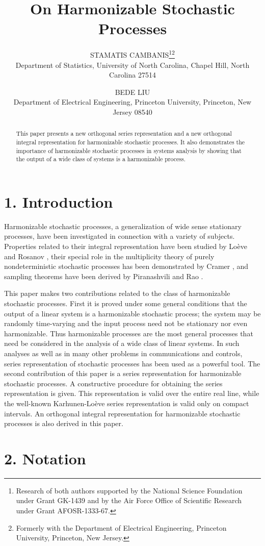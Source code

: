 \documentclass{article}
\title{On Harmonizable Stochastic Processes}
\author{
STAMATIS CAMBANIS\thanks{Research of both authors supported by the National Science Foundation under Grant GK-1439 and by the Air Force Office of Scientific Research under Grant AFOSR-1333-67.}\thanks{Formerly with the Department of Electrical Engineering, Princeton University, Princeton, New Jersey.}\\
Department of Statistics, University of North Carolina, Chapel Hill, North Carolina 27514
\and
BEDE LIU\\
Department of Electrical Engineering, Princeton University, Princeton, New Jersey 08540
}
\begin{document}
\maketitle

\begin{abstract}
This paper presents a new orthogonal series representation and a new orthogonal integral representation for harmonizable stochastic processes. It also demonstrates the importance of harmonizable stochastic processes in systems analysis by showing that the output of a wide class of systems is a harmonizable process.
\end{abstract}

\section*{1. Introduction}

Harmonizable stochastic processes, a generalization of wide sense stationary processes, have been investigated in connection with a variety of subjects. Properties related to their integral representation have been studied by Lo\`{e}ve \cite{loeve1963} and Rosanov \cite{rosanov1959}, their special role in the multiplicity theory of purely nondeterministic stochastic processes has been demonstrated by Cramer \cite{cramer1964}, and sampling theorems have been derived by Piranashvili \cite{piranashvili1967} and Rao \cite{rao1967}.

This paper makes two contributions related to the class of harmonizable stochastic processes. First it is proved under some general conditions that the output of a linear system is a harmonizable stochastic process; the system may be randomly time-varying and the input process need not be stationary nor even harmonizable. Thus harmonizable processes are the most general processes that need be considered in the analysis of a wide class of linear systems. In such analyses as well as in many other problems in communications and controls, series representation of stochastic processes has been used as a powerful tool. The second contribution of this paper is a series representation for harmonizable stochastic processes. A constructive procedure for obtaining the series representation is given. This representation is valid over the entire real line, while the well-known Karhunen-Lo\`{e}ve series representation is valid only on compact intervals. An orthogonal integral representation for harmonizable stochastic processes is also derived in this paper.

\section*{2. Notation}
\end{document}

